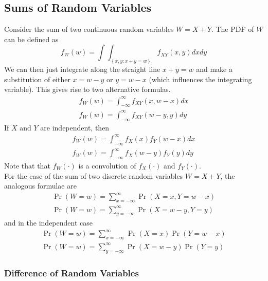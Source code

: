 \documentclass[11pt]{report} %
\begin{document}
\subsection{Sums of Random Variables}

Consider the sum of two continuous random variables $W = X + Y$. The PDF of $W$ can be defined as
\begin{equation}
f_{W}\left(w\right) = \int\int_{\left\{x,y: x + y = w\right\}}f_{XY}\left(x, y\right)dxdy
\end{equation}
We can then just integrate along the straight line $x + y = w$ and make a substitution of either $x = w - y$ or $y = w - x$ (which influences the integrating variable). This gives rise to two alternative formulas.
\begin{gather}
f_{W}\left(w\right) = \int_{-\infty}^{\infty}f_{XY}\left(x, w-x\right)dx \\
f_{W}\left(w\right) = \int_{-\infty}^{\infty}f_{XY}\left(w - y, y\right)dy
\end{gather}
If $X$ and $Y$ are independent, then
\begin{gather}
f_{W}\left(w\right) = \int_{-\infty}^{\infty}f_{X}\left(x\right)f_{Y}\left(w-x\right)dx \\
f_{W}\left(w\right) = \int_{-\infty}^{\infty}f_{X}\left(w - y\right)f_{Y}\left(y\right)dy
\end{gather}
Note that that $f_{W}\left(\cdot\right)$ is a convolution of $f_{X}\left(\cdot\right)$ and $f_{Y}\left(\cdot\right)$. \\

For the case of the sum of two discrete random variables $W = X + Y$, the analogous formulae are
\begin{gather}
\operatorname{Pr}\left(W = w\right) = \sum_{x = -\infty}^{\infty}\operatorname{Pr}\left(X = x, Y = w - x\right) \\
\operatorname{Pr}\left(W = w\right) = \sum_{y = -\infty}^{\infty}\operatorname{Pr}\left(X = w - y, Y = y\right)
\end{gather}
and in the independent case
\begin{gather}
\operatorname{Pr}\left(W = w\right) = \sum_{x = -\infty}^{\infty}\operatorname{Pr}\left(X = x\right)\operatorname{Pr}\left(Y = w - x\right) \\
\operatorname{Pr}\left(W = w\right) = \sum_{y = -\infty}^{\infty}\operatorname{Pr}\left(X = w - y\right)\operatorname{Pr}\left(Y = y\right)
\end{gather}

\subsubsection{Difference of Random Variables}
\end{document}
